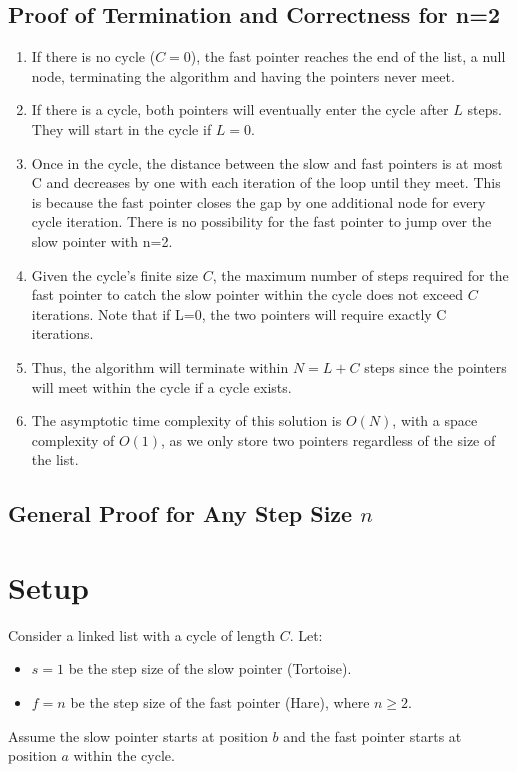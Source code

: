 \documentclass{article}
\begin{document}
\subsection*{Proof of Termination and Correctness for n=2}
\begin{enumerate}
  \item If there is no cycle (\( C = 0 \)), the fast pointer reaches the end of the list, a null node, terminating the algorithm and having the pointers never meet.
  \item If there is a cycle, both pointers will eventually enter the cycle after \( L \) steps. They will start in the cycle if \( L = 0 \).
  \item Once in the cycle, the distance between the slow and fast pointers is at most C and decreases by one with each iteration of the loop until they meet. This is because the fast pointer closes the gap by one additional node for every cycle iteration. There is no possibility for the fast pointer to jump over the slow pointer with n=2.
  \item Given the cycle's finite size \( C \), the maximum number of steps required for the fast pointer to catch the slow pointer within the cycle does not exceed \( C \) iterations. Note that if L=0, the two pointers will require exactly C iterations.
  \item Thus, the algorithm will terminate within \( N = L + C \) steps since the pointers will meet within the cycle if a cycle exists. 
  \item The asymptotic time complexity of this solution is \( O(N) \), with a space complexity of \( O(1) \), as we only store two pointers regardless of the size of the list.
\end{enumerate}

\subsection*{General Proof for Any Step Size \(n\)}

    

\section{Setup}
Consider a linked list with a cycle of length \( C \). Let:
\begin{itemize}
    \item \( s = 1 \) be the step size of the slow pointer (Tortoise).
    \item \( f = n \) be the step size of the fast pointer (Hare), where \( n \geq 2 \).
\end{itemize}
Assume the slow pointer starts at position \( b \) and the fast pointer starts at position \( a \) within the cycle.
\end{document}
